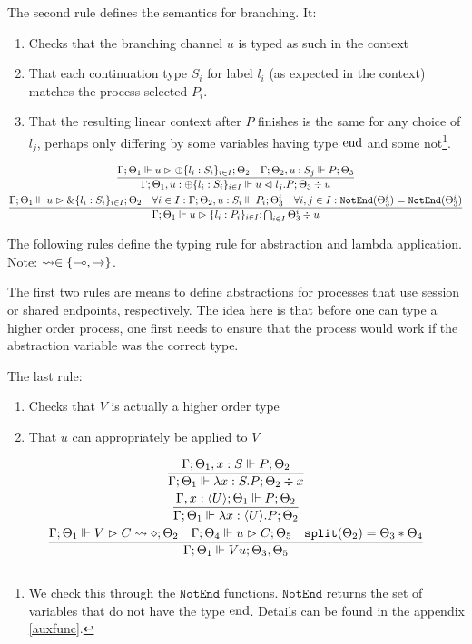 The second rule defines the semantics for branching. It:
\begin{enumerate}
    \item Checks that the branching channel $u$ is typed as such in the context
    \item That each continuation type $S_i$ for label $l_i$ (as expected in the context) matches the process selected $P_i$.
    \item That the resulting linear context after $P$ finishes is the same for any choice of $l_j$, perhaps only differing by some variables having type $\text{end}$ and some not\footnote{We check this through the $\texttt{NotEnd}$ functions.  $\texttt{NotEnd}$ returns the set of variables that do not have the type $\text{end}$. Details can be found in the appendix \ref{auxfunc}.}. 
\end{enumerate}
\begin{gather*}
\frac{\Gamma ; \Theta_1 \Vdash u \vartriangleright \oplus \{l_i : S_i\}_{i\in I}; \Theta_2 \quad \Gamma ; \Theta_2 , u : S_j \Vdash P ; \Theta_3}{\Gamma ; \Theta_1 , u : \oplus\{l_i : S_i\}_{i \in I} \Vdash u \vartriangleleft l_j . P ; \Theta_3 \div u} \\
\frac{\Gamma ; \Theta_1 \Vdash u \vartriangleright \& \{l_i : S_i\}_{i \in I}; \Theta_2 \quad \forall i \in I :\Gamma ; \Theta_2 , u : S_i \Vdash P_i ; \Theta^i_3 \quad \forall i,j \in I : \texttt{NotEnd}(\Theta^i_3) = \texttt{NotEnd}(\Theta_3^i)}{\Gamma ; \Theta_1 \Vdash u \vartriangleright \{l_i : P_i\}_{i \in I} ; \bigcap_{i \in I} \Theta_3^i \div u} \\
\end{gather*}

The following rules define the typing rule for abstraction and lambda application. Note: $\leadsto \in \{\multimap, \rightarrow\}$.

The first two rules are means to define abstractions for processes that use session or shared endpoints, respectively. The idea here is that before one can type a higher order process, one first needs to ensure that the process would work if the abstraction variable was the correct type.

The last rule:
\begin{enumerate}
    \item Checks that $V$ is actually a higher order type
    \item That $u$ can appropriately be applied to $V$
\end{enumerate}
\begin{gather*}
\frac{\Gamma ; \Theta_1 , x : S \Vdash P ; \Theta_2}{\Gamma ; \Theta_1 \Vdash \lambda x : S . P ; \Theta_2 \div x} \\
\frac{\Gamma, x : \langle U \rangle ; \Theta_1 \Vdash P ; \Theta_2}{\Gamma ; \Theta_1 \Vdash \lambda x : \langle U \rangle . P ; \Theta_2} \\
\frac{\Gamma ; \Theta_1 \Vdash V \vartriangleright C \leadsto \diamond ; \Theta_2 \quad \Gamma ; \Theta_4 \Vdash u \vartriangleright C ; \Theta_5 \quad \texttt{split}(\Theta_2) = \Theta_3 * \Theta_4}{\Gamma ; \Theta_1 \Vdash V u ; \Theta_3 , \Theta_5}
\end{gather*}

